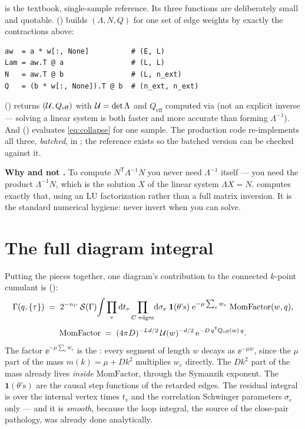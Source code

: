  is the textbook, single-sample reference. Its three
functions are deliberately small and quotable. 
() builds $(\Lambda,N,Q)$ for one set of edge weights
by exactly the contractions above:
\begin{lstlisting}
aw  = a * w[:, None]          # (E, L)
Lam = aw.T @ a                # (L, L)
N   = aw.T @ b                # (L, n_ext)
Q   = (b * w[:, None]).T @ b  # (n_ext, n_ext)
\end{lstlisting}
 () returns
$(\mathcal{U}, Q_{\text{eff}})$ with $\mathcal{U} = \det\Lambda$ and $Q_{\text{eff}}$
computed via  (not an explicit inverse --- solving a linear
system is both faster and more accurate than forming $\Lambda^{-1}$). And
 () evaluates
\eqref{eq:collapse} for one sample. The production code re-implements all three,
\emph{batched}, in ; the reference exists so the batched
version can be checked against it.

\begin{note}
\textbf{Why  and not .} To compute
$N^{\mathsf T}\Lambda^{-1}N$ you never need $\Lambda^{-1}$ itself --- you need the
product $\Lambda^{-1}N$, which is the solution $X$ of the linear system
$\Lambda X = N$.  computes exactly that, using an
LU factorization rather than a full matrix inversion. It is the standard numerical
hygiene: never invert when you can solve.
\end{note}

\section{The full diagram integral}

Putting the pieces together, one diagram's contribution to the connected
$k$-point cumulant is ():
\begin{equation}
  \Gamma(q,\{\tau\}) \;=\; 2^{-n_C}\,\mathcal{S}(\Gamma)\!
     \int \prod_v \mathrm{d} t_v \prod_{C\text{ edges}}\!\mathrm{d}\sigma_e\;
     \mathbf{1}(\theta\text{'s})\;
     \mathrm{e}^{-\mu\sum_e w_e}\;\text{MomFactor}(w,q),
  \label{eq:diagram}
\end{equation}
\begin{equation}
  \text{MomFactor} \;=\; (4\pi D)^{-Ld/2}\,\mathcal{U}(w)^{-d/2}\,
     \mathrm{e}^{-D\,q^{\mathsf T}Q_{\text{eff}}(w)\,q}.
\end{equation}
The factor $\ee^{-\mu\sum_e w_e}$ is the : every segment of
length $w$ decays as $\ee^{-\mu w}$, since the $\mu$ part of the mass $m(k)=\mu+Dk^2$
multiplies $w_e$ directly. The $Dk^2$ part of the mass already lives \emph{inside}
$\text{MomFactor}$, through the Symanzik exponent. The $\mathbf{1}(\theta\text{'s})$
are the causal step functions of the retarded edges. The residual integral is over
the internal vertex times $t_v$ and the correlation Schwinger parameters
$\sigma_e$ only --- and it is \emph{smooth}, because the loop integral, the source
of the close-pair pathology, was already done analytically.

